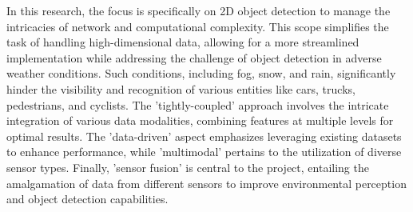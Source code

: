 \documentclass[report.tex]{subfiles}
\begin{document}
        In this research, the focus is specifically on 2D object detection to manage the intricacies of network and computational complexity. This scope simplifies the task of handling high-dimensional data, allowing for a more streamlined implementation while addressing the challenge of object detection in adverse weather conditions. Such conditions, including fog, snow, and rain, significantly hinder the visibility and recognition of various entities like cars, trucks, pedestrians, and cyclists. The 'tightly-coupled' approach involves the intricate integration of various data modalities, combining features at multiple levels for optimal results. The 'data-driven' aspect emphasizes leveraging existing datasets to enhance performance, while 'multimodal' pertains to the utilization of diverse sensor types. Finally, 'sensor fusion' is central to the project, entailing the amalgamation of data from different sensors to improve environmental perception and object detection capabilities.
    





\end{document}

